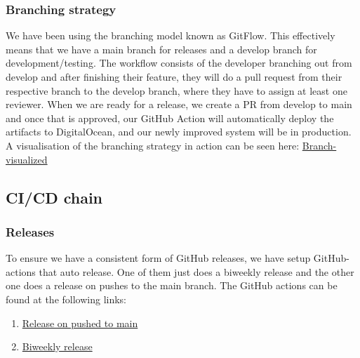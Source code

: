 \documentclass[10pt]{article}
\begin{document}
\subsubsection{Branching strategy}
We have been using the branching model known as GitFlow. This effectively means that we have a main branch for releases and a develop branch for development/testing. The workflow consists of the developer branching out from develop and after finishing their feature, they will do a pull request from their respective branch to the develop branch, where they have to assign at least one reviewer. When we are ready for a release, we create a PR from develop to main and once that is approved, our GitHub Action will automatically deploy the artifacts to DigitalOcean, and our newly improved system will be in production. A visualisation of the branching strategy in action can be seen here: \href{https://github.com/Arklaide/devopsITUproject/network}{Branch-visualized} 

\subsection{CI/CD chain}
\subsubsection{Releases}
To ensure we have a consistent form of GitHub releases, we have setup GitHub-actions that auto release. One of them just does a biweekly release and the other one does a release on pushes to the main branch. The GitHub actions can be found at the following links:
\begin{enumerate}
    \item \href{https://github.com/Arklaide/devopsITUproject/blob/main/.github/workflows/releaseonpush.yml}{Release on pushed to main}
    \item \href{https://github.com/Arklaide/devopsITUproject/blob/main/.github/workflows/autorelease.yml}{Biweekly release}
\end{enumerate}
\end{document}
